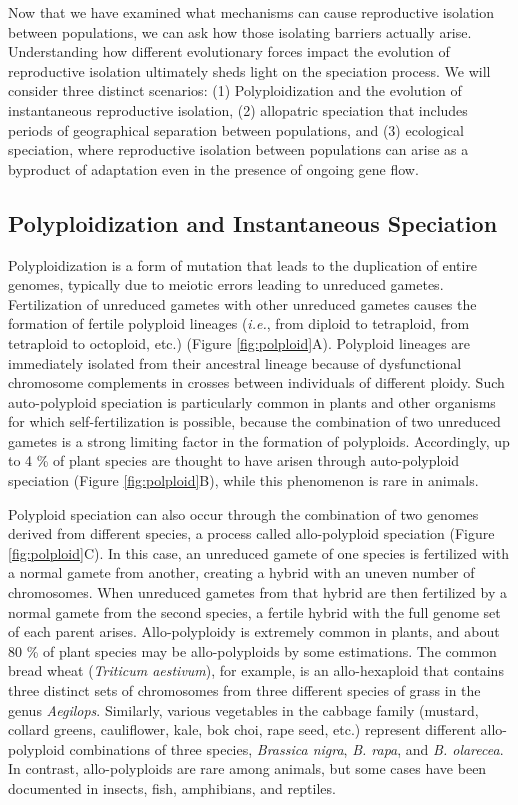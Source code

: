 \documentclass[
]{book}
\begin{document}
Now that we have examined what mechanisms can cause reproductive isolation between populations, we can ask how those isolating barriers actually arise. Understanding how different evolutionary forces impact the evolution of reproductive isolation ultimately sheds light on the speciation process. We will consider three distinct scenarios: (1) Polyploidization and the evolution of instantaneous reproductive isolation, (2) allopatric speciation that includes periods of geographical separation between populations, and (3) ecological speciation, where reproductive isolation between populations can arise as a byproduct of adaptation even in the presence of ongoing gene flow.

\hypertarget{polyploidization-and-instantaneous-speciation}{%
\subsection{Polyploidization and Instantaneous Speciation}\label{polyploidization-and-instantaneous-speciation}}

Polyploidization is a form of mutation that leads to the duplication of entire genomes, typically due to meiotic errors leading to unreduced gametes. Fertilization of unreduced gametes with other unreduced gametes causes the formation of fertile polyploid lineages (\emph{i.e.}, from diploid to tetraploid, from tetraploid to octoploid, etc.) (Figure \ref{fig:polploid}A). Polyploid lineages are immediately isolated from their ancestral lineage because of dysfunctional chromosome complements in crosses between individuals of different ploidy. Such auto-polyploid speciation is particularly common in plants and other organisms for which self-fertilization is possible, because the combination of two unreduced gametes is a strong limiting factor in the formation of polyploids. Accordingly, up to 4 \% of plant species are thought to have arisen through auto-polyploid speciation (Figure \ref{fig:polploid}B), while this phenomenon is rare in animals.

Polyploid speciation can also occur through the combination of two genomes derived from different species, a process called allo-polyploid speciation (Figure \ref{fig:polploid}C). In this case, an unreduced gamete of one species is fertilized with a normal gamete from another, creating a hybrid with an uneven number of chromosomes. When unreduced gametes from that hybrid are then fertilized by a normal gamete from the second species, a fertile hybrid with the full genome set of each parent arises. Allo-polyploidy is extremely common in plants, and about 80 \% of plant species may be allo-polyploids by some estimations. The common bread wheat (\emph{Triticum aestivum}), for example, is an allo-hexaploid that contains three distinct sets of chromosomes from three different species of grass in the genus \emph{Aegilops}. Similarly, various vegetables in the cabbage family (mustard, collard greens, cauliflower, kale, bok choi, rape seed, etc.) represent different allo-polyploid combinations of three species, \emph{Brassica nigra}, \emph{B. rapa}, and \emph{B. olarecea}. In contrast, allo-polyploids are rare among animals, but some cases have been documented in insects, fish, amphibians, and reptiles.
\end{document}
